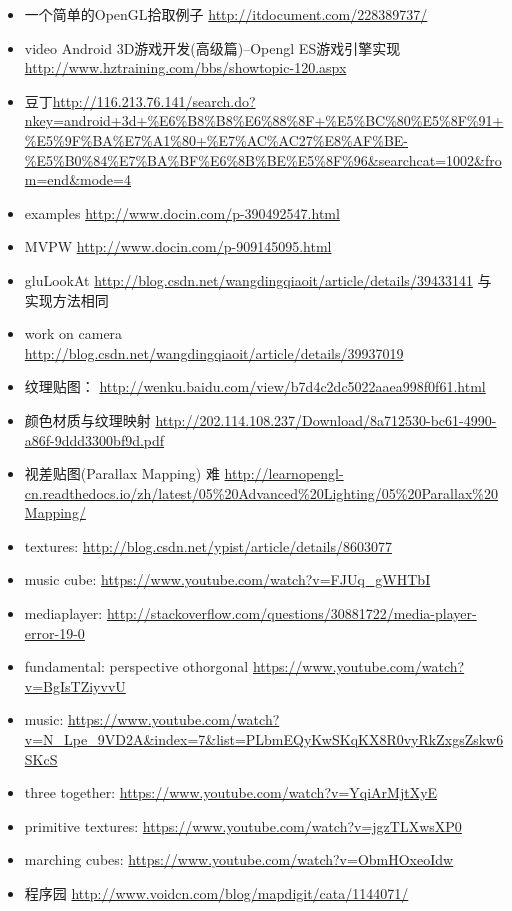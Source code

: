 \documentclass[9pt,b5paper]{article}
\begin{document}
\begin{itemize}
\item 一个简单的OpenGL拾取例子 \url{http://itdocument.com/228389737/}
\item video Android 3D游戏开发(高级篇)--Opengl ES游戏引擎实现 \url{http://www.hztraining.com/bbs/showtopic-120.aspx}
\item 豆丁\url{http://116.213.76.141/search.do?nkey=android+3d+\%E6\%B8\%B8\%E6\%88\%8F+\%E5\%BC\%80\%E5\%8F\%91+\%E5\%9F\%BA\%E7\%A1\%80+\%E7\%AC\%AC27\%E8\%AF\%BE-\%E5\%B0\%84\%E7\%BA\%BF\%E6\%8B\%BE\%E5\%8F\%96&searchcat=1002&from=end&mode=4}
\item examples \url{http://www.docin.com/p-390492547.html}
\item MVPW \url{http://www.docin.com/p-909145095.html}
\item gluLookAt \url{http://blog.csdn.net/wangdingqiaoit/article/details/39433141} 与实现方法相同
\item work on camera \url{http://blog.csdn.net/wangdingqiaoit/article/details/39937019}
\item 纹理贴图： \url{http://wenku.baidu.com/view/b7d4c2dc5022aaea998f0f61.html}
\item 颜色材质与纹理映射 \url{http://202.114.108.237/Download/8a712530-bc61-4990-a86f-9ddd3300bf9d.pdf}
\item 视差贴图(Parallax Mapping) 难 \url{http://learnopengl-cn.readthedocs.io/zh/latest/05\%20Advanced\%20Lighting/05\%20Parallax\%20Mapping/}
\item textures: \url{http://blog.csdn.net/ypist/article/details/8603077}
\item music cube: \url{https://www.youtube.com/watch?v=FJUq_gWHTbI}
\item mediaplayer: \url{http://stackoverflow.com/questions/30881722/media-player-error-19-0}
\item fundamental: perspective othorgonal \url{https://www.youtube.com/watch?v=BgIsTZiyvvU}
\item music: \url{https://www.youtube.com/watch?v=N_Lpe_9VD2A&index=7&list=PLbmEQyKwSKqKX8R0vyRkZxgsZskw6SKcS}
\item three together: \url{https://www.youtube.com/watch?v=YqiArMjtXyE}
\item primitive textures: \url{https://www.youtube.com/watch?v=jgzTLXwsXP0}
\item marching cubes: \url{https://www.youtube.com/watch?v=ObmHOxeoIdw}
\item 程序园 \url{http://www.voidcn.com/blog/mapdigit/cata/1144071/}
\end{itemize}
\end{document}
